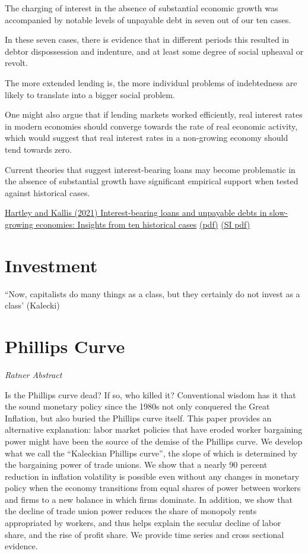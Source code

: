 \documentclass[
]{book}
\begin{document}
The charging of interest in the absence
of substantial economic growth was accompanied by notable levels of
unpayable debt in seven out of our ten cases.

In these seven
cases, there is evidence that in different periods this resulted in debtor
dispossession and indenture, and at least some degree of social upheaval
or revolt.

The more extended lending is, the more individual problems of
indebtedness are likely to translate into a bigger social problem.

One might also argue
that if lending markets worked efficiently, real interest rates in modern
economies should converge towards the rate of real economic activity,
which would suggest that real interest rates in a non-growing economy
should tend towards zero.

Current theories that
suggest interest-bearing loans may become problematic in the absence
of substantial growth have significant empirical support when tested
against historical cases.

\href{https://www.sciencedirect.com/science/article/pii/S0921800921001907}{Hartley and Kallis (2021) Interest-bearing loans and unpayable debts in slow-growing economies: Insights from ten historical cases}
\href{pdf/Hartley_Kallis_2021_Unpayable_debt.pdf}{(pdf)}
\href{pdf/Hartley_Kallis_2021_Unpayable_debt_SI.pdf}{(SI pdf)}

\hypertarget{investment}{%
\chapter{Investment}\label{investment}}

``Now, capitalists do many things as a class, but they certainly do not
invest as a class' (Kalecki)

\hypertarget{phillips-curve}{%
\chapter{Phillips Curve}\label{phillips-curve}}

\emph{Ratner Abstract}

Is the Phillips curve dead? If so, who killed it? Conventional wisdom has it that the sound monetary policy since the 1980s not only conquered the Great Inflation, but also buried the Phillips curve itself. This paper provides an alternative explanation: labor market policies that have eroded worker bargaining power might have been the source of the demise of the Phillips curve. We develop what we call the ``Kaleckian Phillips curve'', the slope of which is determined by the bargaining power of trade unions. We show that a nearly 90 percent reduction in inflation volatility is possible even without any changes in monetary policy when the economy transitions from equal shares of power between workers and firms to a new balance in which firms dominate. In addition, we show that the decline of trade union power reduces the share of monopoly rents appropriated by workers, and thus helps explain the secular decline of labor share, and the rise of profit share. We provide time series and cross sectional evidence.
\end{document}
